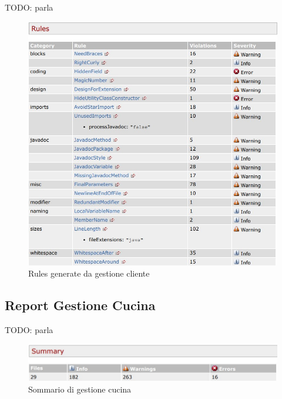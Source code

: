 TODO: parla
\begin{figure}[htbp]
	\centering
	\includegraphics[scale=0.8]{iterazione1/images/Cs_rules_Gestione_Cliente.jpg}
	\caption{Rules generate da gestione cliente\label{fig:Cs_Rules_Gestione_Cliente}}
\end{figure}

\newpage

\subsection{Report Gestione Cucina}

TODO: parla
\begin{figure}[htbp]
	\centering
	\includegraphics[scale=0.6]{iterazione1/images/Cs_Summary_Gestione_Cucina.jpg}
	\caption{Sommario di gestione cucina\label{fig:Cs_Summary_Gestione_Cucina}}
\end{figure}

